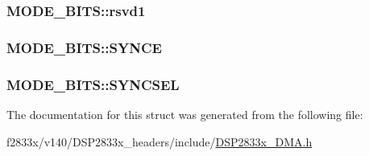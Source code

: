 \subsubsection[{rsvd1}]{ M\+O\+D\+E\+\_\+\+B\+I\+T\+S\+::rsvd1}\label{struct_m_o_d_e___b_i_t_s_a91928458ccf564bdc6a272a73e8776b9}
\hypertarget{struct_m_o_d_e___b_i_t_s_a4ea2b332f7de983c1c5d1fcad04b0156}{}
\subsubsection[{S\+Y\+N\+C\+E}]{ M\+O\+D\+E\+\_\+\+B\+I\+T\+S\+::\+S\+Y\+N\+C\+E}\label{struct_m_o_d_e___b_i_t_s_a4ea2b332f7de983c1c5d1fcad04b0156}
\hypertarget{struct_m_o_d_e___b_i_t_s_aea6c50775d74b845ce6d1dd3d1f74d1c}{}
\subsubsection[{S\+Y\+N\+C\+S\+E\+L}]{ M\+O\+D\+E\+\_\+\+B\+I\+T\+S\+::\+S\+Y\+N\+C\+S\+E\+L}\label{struct_m_o_d_e___b_i_t_s_aea6c50775d74b845ce6d1dd3d1f74d1c}


The documentation for this struct was generated from the following file\+:\begin{DoxyCompactItemize}
\item 
f2833x/v140/\+D\+S\+P2833x\+\_\+headers/include/\hyperlink{_d_s_p2833x___d_m_a_8h}{D\+S\+P2833x\+\_\+\+D\+M\+A.\+h}\end{DoxyCompactItemize}

